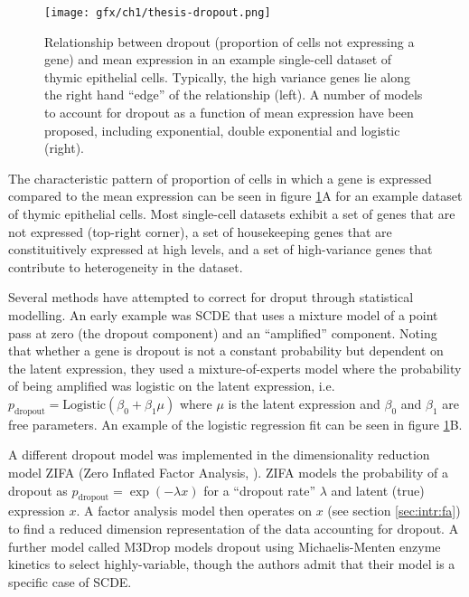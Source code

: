 \begin{figure}
\centering
  \texttt{[image: gfx/ch1/thesis-dropout.png]}
  \caption{Relationship between dropout (proportion of cells not expressing a gene) and mean expression in an example single-cell dataset of thymic epithelial cells. Typically, the high variance genes lie along the right hand ``edge'' of the relationship (left). A number of models to account for dropout as a function of mean expression have been proposed, including exponential, double exponential and logistic (right).} \label{fig:intro_dropout}
\end{figure}

The characteristic pattern of proportion of cells in which a gene is expressed compared to the mean expression can be seen in figure \ref{fig:intro_dropout}A for an example dataset of thymic epithelial cells. Most single-cell datasets exhibit a set of genes that are not expressed (top-right corner), a set of housekeeping genes that are constituitively expressed at high levels, and a set of high-variance genes that contribute to heterogeneity in the dataset.

Several methods have attempted to correct for droput through statistical modelling. An early example was SCDE \cite{kharchenko2014bayesian} that uses a mixture model of a point pass at zero (the dropout component) and an ``amplified'' component. Noting that whether a gene is dropout is not a constant probability but dependent on the latent expression, they used a mixture-of-experts model where the probability of being amplified was logistic on the latent expression, i.e. $p_{\text{dropout}} = \text{Logistic}(\beta_0 + \beta_1 \mu)$ where $\mu$ is the latent expression and $\beta_0$ and $\beta_1$ are free parameters. An example of the logistic regression fit can be seen in figure \ref{fig:intro_dropout}B.

A different dropout model was implemented in the dimensionality reduction model ZIFA (Zero Inflated Factor Analysis, \cite{pierson2015zifa}). ZIFA models the probability of a dropout as $p_{\text{dropout}} = \exp(-\lambda x)$ for a ``dropout rate'' $\lambda$ and latent (true) expression $x$. A factor analysis model then operates on $x$ (see section \ref{sec:intr:fa}) to find a reduced dimension representation of the data accounting for dropout. A further model called M3Drop \cite{Andrews2016-ij} models dropout using Michaelis-Menten enzyme kinetics to select highly-variable, though the authors admit that their model is a specific case of SCDE.


